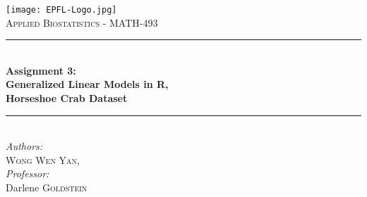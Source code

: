 \documentclass[a4paper, 12pt]{article}
\begin{document}
\begin{titlepage}
\newcommand{\HRule}{\rule{\linewidth}{0.5mm}} %

\center %
 



\texttt{[image: EPFL-Logo.jpg]}\\[2cm] %
 

\textsc{\Large Applied Biostatistics \hspace{4pt} -\hspace{6pt} MATH-493}\\[1cm] %


\HRule \\[0.4cm]
{ \LARGE \bfseries Assignment 3: \\ Generalized Linear Models in R,\vspace{6pt}\\ Horseshoe Crab Dataset}\\[0.4cm] %
\HRule \\[1cm]
 

\Large \emph{Authors:}\\[0.5cm]
\textsc{Wong Wen Yan},   \\[2cm] %
\Large \emph{Professor:}\\[0.5cm]
Darlene \textsc{Goldstein}  \\[3cm]




\end{titlepage}
\end{document}
